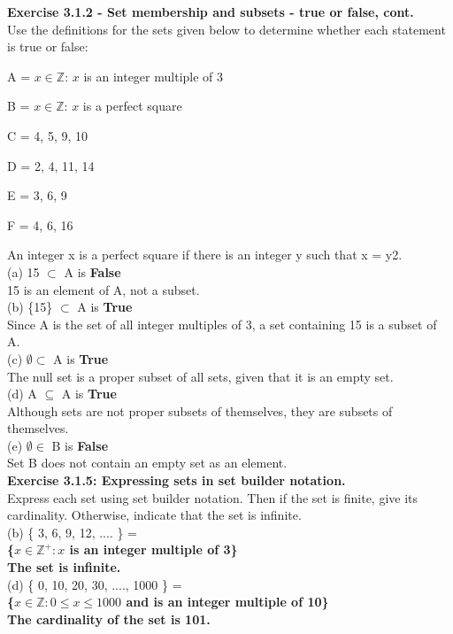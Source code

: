 \documentclass[12pt, letterpaper, twoside]{article}
\begin{document}
\newpage
\noindent \textbf{Exercise 3.1.2 - Set membership and subsets - true or false, cont.}\\
Use the definitions for the sets given below to determine whether each statement is true or false:
\begin{description}[noitemsep,topsep=0pt]
\item A = { $x \in \mathbb{Z}$: $x$ is an integer multiple of 3 }
\item B = { $x \in \mathbb{Z}$: $x$ is a perfect square }
\item C = { 4, 5, 9, 10 }
\item D = { 2, 4, 11, 14 }
\item E = { 3, 6, 9 }
\item F = { 4, 6, 16 }
\end{description}
An integer x is a perfect square if there is an integer y such that x = y2.\\
\break
(a) 15 $\subset$ A is \textbf{False} \\
15 is an element of A, not a subset.\\
\break
(b) \{15\} $\subset$ A is \textbf{True} \\
Since A is the set of all integer multiples of 3, a set containing 15 is a subset of A.\\
\break
(c) $\emptyset \subset$ A is \textbf{True} \\
The null set is a proper subset of all sets, given that it is an empty set.\\
\break
(d) A $\subseteq$ A is \textbf{True} \\
Although sets are not proper subsets of themselves, they are subsets of themselves.\\
\break
(e) $\emptyset \in$ B is \textbf{False} \\
Set B does not contain an empty set as an element. \\
\break
\noindent \textbf{Exercise 3.1.5: Expressing sets in set builder notation.}\\
Express each set using set builder notation. Then if the set is finite, give its cardinality. Otherwise, indicate that the set is infinite.\\
\break
(b) \{ 3, 6, 9, 12, .... \} = \\\textbf{\{$x \in \mathbb{Z}^+: x$ is an integer multiple of 3\}}\\
\textbf{The set is infinite.}\\
\break
(d) \{ 0, 10, 20, 30, ...., 1000 \} = \\\textbf{\{$x \in \mathbb{Z}: 0 \leq x \leq 1000$ and is an integer multiple of 10\}}\\
\textbf{The cardinality of the set is 101.}\\
\end{document}
